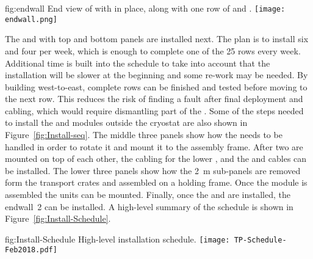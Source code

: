 \begin{dunefigure}{fig:endwall}
  {End view of  with  in
  place, along with one row of  and .}
\texttt{[image: endwall.png]}
\end{dunefigure}

The  and  with top and bottom  panels are
installed next. The plan is to install six  and four
 per week, which is enough to complete one of the \num{25}
rows every week. Additional time is built into the schedule to take
into account that the installation will be slower at the beginning and
some re-work may be needed. By building west-to-east, complete rows can
be finished and tested before moving to the next row. This reduces the
risk of finding a fault after final  deployment and cabling,
which would require dismantling part of the . Some of the steps
needed to install the  and  modules outside the
cryostat are also shown in Figure~\ref{fig:Install-seq}.  The middle three
panels show how the  needs to be handled in order to rotate
it and mount it to the assembly frame. After two  are
mounted on top of each other, the cabling for the lower , and the
 and  cables can be installed. The
lower three panels show how the \SI{2}{m}  sub-panels are
removed form the transport crates and assembled on a holding frame. Once
the  module is assembled the  units can be
mounted. Finally, once the  and  are installed,
the endwall~2 can be installed. A high-level summary of the schedule
is shown in Figure~\ref{fig:Install-Schedule}.

\begin{dunefigure}{fig:Install-Schedule}
  {High-level installation schedule.}
 \texttt{[image: TP-Schedule-Feb2018.pdf]}
\end{dunefigure}


